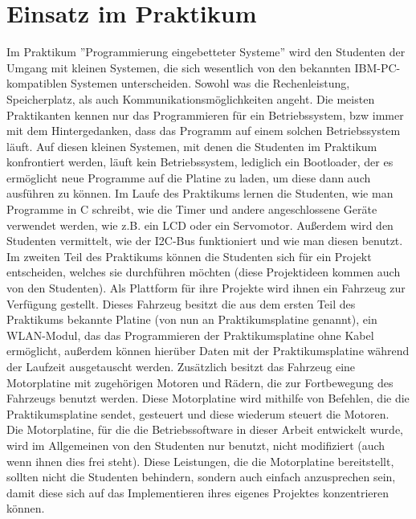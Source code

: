 \chapter{Einsatz im Praktikum}
Im Praktikum ''Programmierung eingebetteter Systeme'' wird den Studenten der
Umgang mit kleinen Systemen, die sich wesentlich von den bekannten IBM-PC-kompatiblen
Systemen unterscheiden. Sowohl was die Rechenleistung, Speicherplatz, als auch
Kommunikationsmöglichkeiten angeht. Die meisten Praktikanten kennen nur das Programmieren
für ein Betriebssystem, bzw immer mit dem Hintergedanken, dass das Programm auf einem
solchen Betriebssystem läuft. Auf diesen kleinen Systemen, mit denen die Studenten im
Praktikum konfrontiert werden, läuft kein Betriebssystem, lediglich ein Bootloader, der
es ermöglicht neue Programme auf die Platine zu laden, um diese dann auch ausführen zu können.
Im Laufe des Praktikums lernen die Studenten, wie man Programme in C schreibt, wie die Timer
und andere angeschlossene Geräte verwendet werden, wie z.B. ein LCD oder ein Servomotor.
Außerdem wird den Studenten vermittelt, wie der I2C-Bus funktioniert und wie man diesen benutzt.\\
Im zweiten Teil des Praktikums können die Studenten sich für ein Projekt entscheiden,
welches sie durchführen möchten (diese Projektideen kommen auch von den Studenten).
Als Plattform für ihre Projekte wird ihnen ein Fahrzeug zur Verfügung gestellt. Dieses
Fahrzeug besitzt die aus dem ersten Teil des Praktikums bekannte Platine (von nun an
Praktikumsplatine genannt), ein WLAN-Modul, das das Programmieren der Praktikumsplatine
ohne Kabel ermöglicht, außerdem können hierüber Daten mit der Praktikumsplatine während
der Laufzeit ausgetauscht werden. Zusätzlich besitzt das Fahrzeug eine Motorplatine mit
zugehörigen Motoren und Rädern, die zur Fortbewegung des Fahrzeugs benutzt werden. Diese
Motorplatine wird mithilfe von Befehlen, die die Praktikumsplatine sendet, gesteuert und
diese wiederum steuert die Motoren.\\
Die Motorplatine, für die die Betriebssoftware in dieser Arbeit entwickelt wurde, wird
im Allgemeinen von den Studenten nur benutzt, nicht modifiziert (auch wenn ihnen dies
frei steht). Diese Leistungen, die die Motorplatine bereitstellt, sollten nicht die Studenten
behindern, sondern auch einfach anzusprechen sein, damit diese sich auf das Implementieren
ihres eigenes Projektes konzentrieren können.\\
